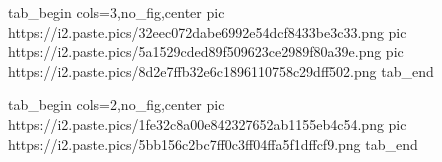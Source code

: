  
 
 
 
 
\zzSecCmtScr

\ifcmt
  tab_begin cols=3,no_fig,center
		 pic https://i2.paste.pics/32eec072dabe6992e54dcf8433be3c33.png
		 pic https://i2.paste.pics/5a1529cded89f509623ce2989f80a39e.png
		 pic https://i2.paste.pics/8d2e7ffb32e6c1896110758c29dff502.png
  tab_end
\fi

\ifcmt
  tab_begin cols=2,no_fig,center
		pic https://i2.paste.pics/1fe32c8a00e842327652ab1155eb4c54.png
		pic https://i2.paste.pics/5bb156c2bc7ff0c3ff04ffa5f1dffcf9.png
  tab_end
\fi
